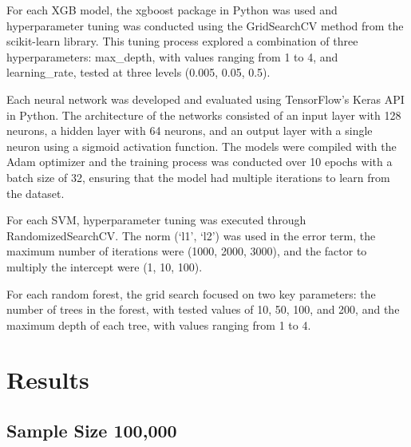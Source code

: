 \documentclass[
  man]{apa7}
\begin{document}
For each XGB model, the xgboost package in Python was used and hyperparameter tuning was conducted using the GridSearchCV method from the scikit-learn library. This tuning process explored a combination of three hyperparameters: max\_depth, with values ranging from 1 to 4, and learning\_rate, tested at three levels (0.005, 0.05, 0.5).

Each neural network was developed and evaluated using TensorFlow's Keras API in Python. The architecture of the networks consisted of an input layer with 128 neurons, a hidden layer with 64 neurons, and an output layer with a single neuron using a sigmoid activation function. The models were compiled with the Adam optimizer and the training process was conducted over 10 epochs with a batch size of 32, ensuring that the model had multiple iterations to learn from the dataset.

For each SVM, hyperparameter tuning was executed through RandomizedSearchCV. The norm (`l1', `l2') was used in the error term, the maximum number of iterations were (1000, 2000, 3000), and the factor to multiply the intercept were (1, 10, 100).

For each random forest, the grid search focused on two key parameters: the number of trees in the forest, with tested values of 10, 50, 100, and 200, and the maximum depth of each tree, with values ranging from 1 to 4.

\hypertarget{results}{%
\section{Results}\label{results}}

\hypertarget{sample-size-100000}{%
\subsection{Sample Size 100,000}\label{sample-size-100000}}

\begingroup
\setlength{\belowcaptionskip}{-10pt}
\endgroup
\end{document}
